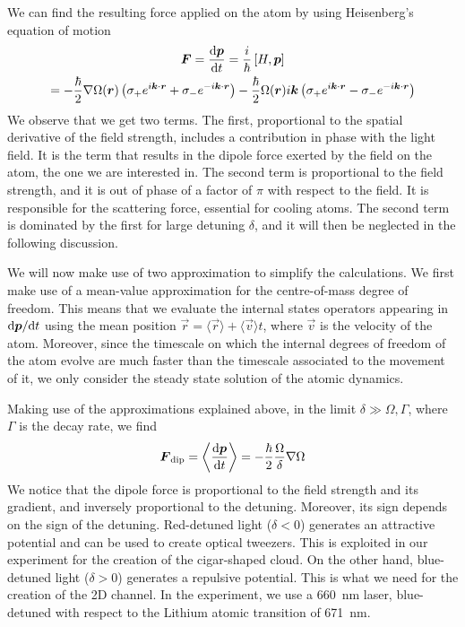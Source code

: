 We can find the resulting force applied on the atom by using Heisenberg's equation of motion
\begin{multline}
    \vec{F} = \frac{\differential\vec{p}}{\differential t} = \frac{i}{\hbar} \left[ H, \vec{p} \right] \\= - \frac{\hbar}{2} \nabla \Omega(\vec{r}) \left( \sigma_+ e^{i\vec{k}\cdot \vec{r}} +  \sigma_{-} e^{-i\vec{k}\cdot \vec{r} } \right) - \frac{\hbar
    }{2} \Omega(\vec{r}) i \vec{k} \left( \sigma_+ e^{i\vec{k}\cdot \vec{r}} -  \sigma_{-} e^{-i\vec{k}\cdot \vec{r} } \right)
\end{multline}
We observe that we get two terms. The first, proportional to the spatial derivative of the field strength, includes a contribution in phase with the light field. It is the term that results in the dipole force exerted by the field on the atom, the one we are interested in. The second term is proportional to the field strength, and it is out of phase of a factor of $\pi$ with respect to the field. It is responsible for the scattering force, essential for cooling atoms. The second term is dominated  by the first for large detuning $\delta$, and it will then be neglected in the following discussion.

We will now make use of two approximation to simplify the calculations. We first make use of a mean-value approximation for the centre-of-mass degree of freedom. This means that we evaluate the internal states operators appearing in $\differential \vec{p} / \differential t$ using the mean position $\vec{r} = \langle \vec{r} \rangle + \langle \vec{v} \rangle t$, where $\vec{v}$ is the velocity of the atom. Moreover, since the timescale on which the internal degrees of freedom of the atom evolve are much faster than the timescale associated to the movement of it, we only consider the steady state solution of the atomic dynamics.

Making use of the approximations explained above, in the limit $\delta  \gg \Omega, \Gamma$, where $\Gamma$ is the decay rate, we find
\begin{equation}
    \vec{F}_\text{dip} = \left\langle \frac{\differential \vec{p}}{\differential t} \right\rangle = - \frac{\hbar}{2} \frac{\Omega}{\delta} \nabla \Omega
\end{equation}
We notice that the dipole force is proportional to the field strength and its gradient, and inversely proportional to the detuning. Moreover, its sign depends on the sign of the detuning. Red-detuned light ($\delta < 0$) generates an attractive potential and can be used to create optical tweezers. This is exploited in our experiment for the creation of the cigar-shaped cloud. On the other hand, blue-detuned light ($\delta > 0$) generates a repulsive potential. This is what we need for the creation of the 2D channel. In the experiment, we use a \SI{660}{nm} laser, blue-detuned with respect to the Lithium atomic transition of \SI{671}{nm}.

